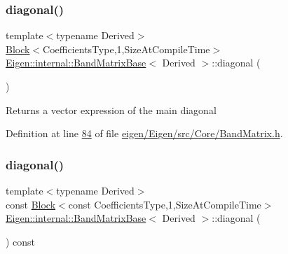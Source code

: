 \subsubsection{\texorpdfstring{diagonal()}{diagonal()}\hspace{0.1cm}{\footnotesize\ttfamily [2/12]}}
{\footnotesize\ttfamily template$<$typename Derived$>$ \\
\hyperlink{group___core___module_class_eigen_1_1_block}{Block}$<$Coefficients\+Type,1,Size\+At\+Compile\+Time$>$ \hyperlink{class_eigen_1_1internal_1_1_band_matrix_base}{Eigen\+::internal\+::\+Band\+Matrix\+Base}$<$ Derived $>$\+::diagonal (\begin{DoxyParamCaption}{ }\end{DoxyParamCaption})\hspace{0.3cm}{\ttfamily [inline]}}

\begin{DoxyReturn}{Returns}
a vector expression of the main diagonal 
\end{DoxyReturn}


Definition at line \hyperlink{eigen_2_eigen_2src_2_core_2_band_matrix_8h_source_l00084}{84} of file \hyperlink{eigen_2_eigen_2src_2_core_2_band_matrix_8h_source}{eigen/\+Eigen/src/\+Core/\+Band\+Matrix.\+h}.

\mbox{\label{class_eigen_1_1internal_1_1_band_matrix_base_a7c55438da88b00d29f8f514bddfa86ba}} 
\subsubsection{\texorpdfstring{diagonal()}{diagonal()}\hspace{0.1cm}{\footnotesize\ttfamily [3/12]}}
{\footnotesize\ttfamily template$<$typename Derived$>$ \\
const \hyperlink{group___core___module_class_eigen_1_1_block}{Block}$<$const Coefficients\+Type,1,Size\+At\+Compile\+Time$>$ \hyperlink{class_eigen_1_1internal_1_1_band_matrix_base}{Eigen\+::internal\+::\+Band\+Matrix\+Base}$<$ Derived $>$\+::diagonal (\begin{DoxyParamCaption}{ }\end{DoxyParamCaption}) const\hspace{0.3cm}{\ttfamily [inline]}}

